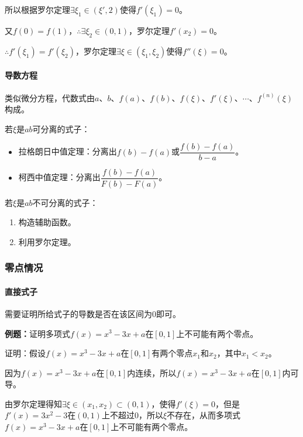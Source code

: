 所以根据罗尔定理$\exists\xi_1\in(\xi',2)$使得$f'(\xi_1)=0$。

又$f(0)=f(1)$，$\therefore\exists\xi_2\in(0,1)$，罗尔定理$f'(x_2)=0$。

$\therefore f'(\xi_1)=f'(\xi_2)$，罗尔定理$\exists\xi\in(\xi_1,\xi_2)$使得$f''(\xi)=0$。

\paragraph{导数方程} \leavevmode \medskip

类似微分方程，代数式由$a$、$b$、$f(a)$、$f(b)$、$f(\xi)$、$f'(\xi)$、$\cdots$、$f^{(n)}(\xi)$构成。

若$\xi$是$ab$可分离的式子：

\begin{itemize}
    \item 拉格朗日中值定理：分离出$f(b)-f(a)$或$\dfrac{f(b)-f(a)}{b-a}$。
    \item 柯西中值定理：分离出$\dfrac{f(b)-f(a)}{F(b)-F(a)}$。
\end{itemize}

若$\xi$是$ab$不可分离的式子：

\begin{enumerate}
    \item 构造辅助函数。
    \item 利用罗尔定理。
\end{enumerate}

\subsubsection{零点情况}

\paragraph{直接式子} \leavevmode \medskip

需要证明所给式子的导数是否在该区间为0即可。

\textbf{例题：}证明多项式$f(x)=x^3-3x+a$在$[0,1]$上不可能有两个零点。

证明：假设$f(x)=x^3-3x+a$在$[0,1]$有两个零点$x_1$和$x_2$，其中$x_1<x_2$。

因为$f(x)=x^3-3x+a$在$[0,1]$内连续，所以$f(x)=x^3-3x+a$在$[0,1]$内可导。

由罗尔定理得知$\exists\xi\in(x_1,x_2)\subset(0,1)$，使得$f'(\xi)=0$，但是$f'(x)=3x^2-3$在$(0,1)$上不超过0，所以$\xi$不存在，从而多项式$f(x)=x^3-3x+a$在$[0,1]$上不可能有两个零点。


